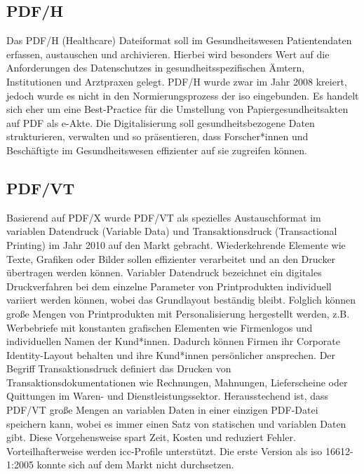\subsection{PDF/H}
Das PDF/H (Healthcare) Dateiformat soll im Gesundheitswesen Patientendaten erfassen, austauschen und archivieren. Hierbei wird besonders Wert auf die Anforderungen des Datenschutzes in gesundheitsspezifischen Ämtern, Institutionen und Arztpraxen gelegt. PDF/H wurde zwar im Jahr 2008 kreiert, jedoch wurde es nicht in den Normierungsprozess der \gls{iso} eingebunden. \cite{proj-consult} Es handelt sich eher um eine Best-Practice für die Umstellung von Papiergesundheitsakten auf PDF als e-Akte. Die Digitalisierung soll gesundheitsbezogene Daten strukturieren, verwalten und so präsentieren, dass Forscher*innen und Beschäftigte im Gesundheitswesen effizienter auf sie zugreifen können.


\subsection{PDF/VT}
Basierend auf PDF/X wurde PDF/VT als spezielles Austauschformat im variablen Datendruck (Variable Data) und Transaktionsdruck (Transactional Printing) im Jahr 2010 auf den Markt gebracht. \cite{adobe-pdf-vt} Wiederkehrende Elemente wie Texte, Grafiken oder Bilder sollen effizienter verarbeitet und an den Drucker übertragen werden können. \cite{adobe-pdf-e} Variabler Datendruck bezeichnet ein digitales Druckverfahren bei dem einzelne Parameter von Printprodukten individuell variiert werden können, wobei das Grundlayout beständig bleibt. Folglich können große Mengen von Printprodukten mit Personalisierung hergestellt werden, z.B. Werbebriefe mit konstanten grafischen Elementen wie Firmenlogos und individuellen Namen der Kund*innen. Dadurch können Firmen ihr Corporate Identity-Layout behalten und ihre Kund*innen persönlicher ansprechen. Der Begriff Transaktionsdruck definiert das Drucken von Transaktionsdokumentationen wie Rechnungen, Mahnungen, Lieferscheine oder Quittungen im Waren- und Dienstleistungssektor. Herausstechend ist, dass PDF/VT große Mengen an variablen Daten in einer einzigen PDF-Datei speichern kann, wobei es immer einen Satz von statischen und variablen Daten gibt. Diese Vorgehensweise spart Zeit, Kosten und reduziert Fehler. Vorteilhafterweise werden \gls{icc}-Profile unterstützt. \cite{adobe-pdf-vt} Die erste Version als \gls{iso} 16612-1:2005 konnte sich auf dem Markt nicht durchsetzen. \cite{proj-consult}

